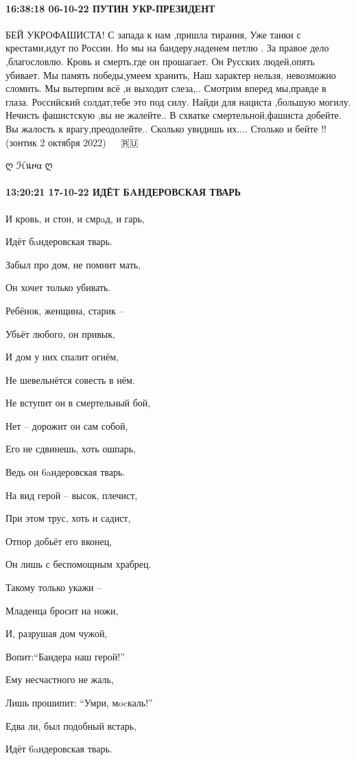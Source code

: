 \paragraph{16:38:18 06-10-22 ПУТИН УКР-ПРЕЗИДЕНТ}
БЕЙ УКРОФАШИСТА!
С запада к нам ,пришла тирания,
Уже танки с крестами,идут по России.
Но мы на бандеру,наденем петлю .
За правое дело ,благословлю.
Кровь и смерть,где он прошагает.
Он Русских людей,опять убивает.
Мы память победы,умеем хранить,
Наш характер нельзя, невозможно сломить.
Мы вытерпим всё ,и выходит слеза,..
Смотрим вперед мы,правде в глаза.
Российский солдат,тебе это под силу.
Найди для нациста ,большую могилу.
Нечисть фашистскую ,вы не жалейте..
В схватке смертельной,фашиста добейте.
Вы жалость к врагу,преодолейте..
Сколько увидишь их....
Столько и бейте !!
(зонтик 2 октября 2022)
👊 👊 🇷🇺


ღ ℋนዞα ღ


\paragraph{13:20:21 17-10-22 ИДЁТ БAНДЕРОВСКАЯ ТВАРЬ}

И кровь, и стон, и смрaд, и гарь,

Идёт бaндеровская тварь.

Забыл про дом, не помнит мать,

Он хочет только убивать.


Ребёнок, женщина, старик –

Убьёт любого, он привык,

И дом у них спалит огнём,

Не шевельнётся совесть в нём.

Не вступит он в смертельный бой,

Нет – дорожит он сам собой,


Его не сдвинешь, хоть ошпарь,

Ведь он 6aндеровская тварь.

На вид герой – высок, плечист,

При этом трус, хоть и садист,

Отпор добьёт его вконец,

Он лишь с беспомощным храбрец.


Такому только укажи –

Младенца бросит на ножи,

И, разрушая дом чужой, 

Вопит:“Бандера наш герой!”

Ему несчастного не жаль,

Лишь прошипит: “Умри, мocкаль!”


Едва ли, был подобный встарь,

Идёт 6aндеровская тварь.
